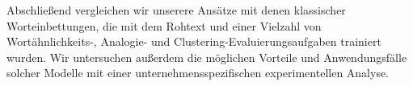 Abschließend vergleichen wir unserere Ansätze mit denen klassischer Worteinbettungen, die mit dem Rohtext und einer Vielzahl von Wortähnlichkeits-, Analogie- und Clustering-Evaluierungsaufgaben trainiert wurden. Wir untersuchen außerdem die möglichen Vorteile und Anwendungsfälle solcher Modelle mit einer unternehmensspezifischen experimentellen Analyse.